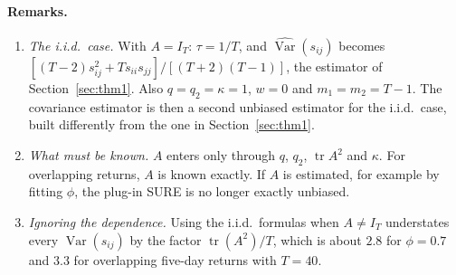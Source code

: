 \paragraph{Remarks.}
\begin{enumerate}
  \item \emph{The i.i.d.\ case.} With $A = I_T$: $\tau = 1/T$, and $\widehat{\operatorname{Var}}(s_{ij})$ becomes $[(T-2)s_{ij}^2 + T s_{ii}s_{jj}]/[(T+2)(T-1)]$, the estimator of Section~\ref{sec:thm1}. Also $q = q_2 = \kappa = 1$, $w = 0$ and $m_1 = m_2 = T - 1$. The covariance estimator is then a second unbiased estimator for the i.i.d.\ case, built differently from the one in Section~\ref{sec:thm1}.
  \item \emph{What must be known.} $A$ enters only through $q$, $q_2$, $\operatorname{tr}A^2$ and $\kappa$. For overlapping returns, $A$ is known exactly. If $A$ is estimated, for example by fitting $\phi$, the plug-in SURE is no longer exactly unbiased.
  \item \emph{Ignoring the dependence.} Using the i.i.d.\ formulas when $A \neq I_T$ understates every $\operatorname{Var}(s_{ij})$ by the factor $\operatorname{tr}(A^2)/T$, which is about $2.8$ for $\phi = 0.7$ and $3.3$ for overlapping five-day returns with $T = 40$.
\end{enumerate}

